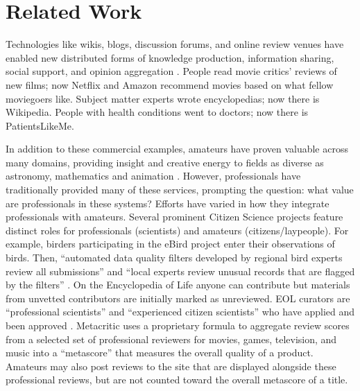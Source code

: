 \documentclass{sig-alternate}
\begin{document}
\section{Related Work}
Technologies like wikis, blogs, discussion forums, and online review
venues have enabled new distributed forms of knowledge production,
information sharing, social support, and opinion aggregation \cite{Benkler2006Wealth}. People read movie critics' reviews of new films; now Netflix and Amazon recommend movies based on what fellow moviegoers like. Subject matter experts wrote encyclopedias; now there is Wikipedia. People with health conditions went to doctors; now there is PatientsLikeMe. 

In addition to these commercial examples, amateurs have proven valuable
across many domains, providing insight and creative energy to fields as diverse as astronomy, mathematics and animation \cite{cooper2010predicting, cranshaw2011polymath, kanefsky2001can, luther2013redistributing}.
However, professionals have traditionally provided many of these services, prompting the question: what value are professionals in these systems?
Efforts have varied in how they integrate professionals with amateurs.
Several prominent Citizen Science projects feature distinct roles for professionals (scientists) and amateurs (citizens/laypeople). For example, birders participating in the eBird project enter their observations of birds. Then, ``automated data quality filters developed by regional bird experts review all submissions'' and ``local experts review unusual records that are flagged by the filters'' \cite{sullivan2009ebird}.
On the Encyclopedia of Life anyone can contribute but materials from
unvetted contributors are initially marked as unreviewed. EOL curators
are ``professional scientists'' and ``experienced citizen scientists'' who have applied and been approved \cite{encyclopediaoflife}. 
Metacritic uses a proprietary formula to aggregate review scores from a selected set of professional reviewers for movies, games, television, and music into a ``metascore'' that measures the overall quality of a product. Amateurs may also post reviews to the site that are displayed alongside these professional reviews, but are not counted toward the overall metascore of a title.
\end{document}
